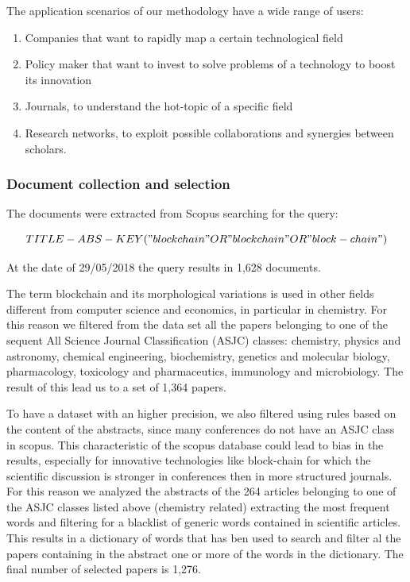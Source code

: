 \documentclass[]{book}
\providecommand{\tightlist}{%
  \setlength{\itemsep}{0pt}\setlength{\parskip}{0pt}}
\begin{document}
The application scenarios of our methodology have a wide range of users:

\begin{enumerate}
\def\labelenumi{\arabic{enumi}.}
\tightlist
\item
  Companies that want to rapidly map a certain technological field
\item
  Policy maker that want to invest to solve problems of a technology to
  boost its innovation
\item
  Journals, to understand the hot-topic of a specific field
\item
  Research networks, to exploit possible collaborations and synergies
  between scholars.
\end{enumerate}

\subsubsection*{Document collection and
selection}\label{document-collection-and-selection}

The documents were extracted from Scopus searching for the query:

\begin{equation*} 
  TITLE-ABS-KEY("blockchain" OR "block chain" OR "block-chain")
\end{equation*}

At the date of 29/05/2018 the query results in 1,628 documents.

The term blockchain and its morphological variations is used in other
fields different from computer science and economics, in particular in
chemistry. For this reason we filtered from the data set all the papers
belonging to one of the sequent All Science Journal Classification
(ASJC) classes: chemistry, physics and astronomy, chemical engineering,
biochemistry, genetics and molecular biology, pharmacology, toxicology
and pharmaceutics, immunology and microbiology. The result of this lead
us to a set of 1,364 papers.

To have a dataset with an higher precision, we also filtered using rules
based on the content of the abstracts, since many conferences do not
have an ASJC class in scopus. This characteristic of the scopus database
could lead to bias in the results, especially for innovative
technologies like block-chain for which the scientific discussion is
stronger in conferences then in more structured journals. For this
reason we analyzed the abstracts of the 264 articles belonging to one of
the ASJC classes listed above (chemistry related) extracting the most
frequent words and filtering for a blacklist of generic words contained
in scientific articles. This results in a dictionary of words that has
ben used to search and filter al the papers containing in the abstract
one or more of the words in the dictionary. The final number of selected
papers is 1,276.
\end{document}
